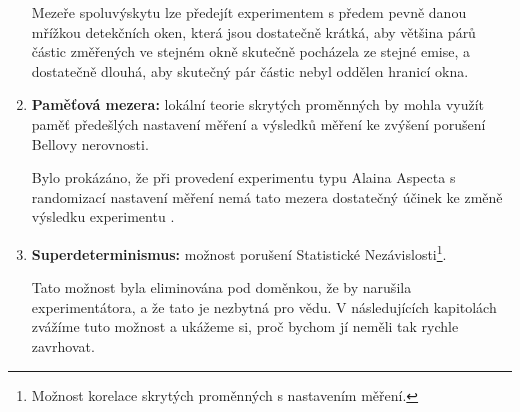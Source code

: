 \begin{enumerate}
        Mezeře spoluvýskytu lze předejít experimentem s předem pevně danou mřížkou detekčních oken, která jsou dostatečně krátká, aby většina párů částic změřených ve stejném okně skutečně pocházela ze stejné emise, a dostatečně dlouhá, aby skutečný pár částic nebyl oddělen hranicí okna.

        \item \textbf{Paměťová mezera:} lokální teorie skrytých proměnných by mohla využít paměť předešlých nastavení měření a výsledků měření ke zvýšení porušení Bellovy nerovnosti.
        
        Bylo prokázáno, že při provedení experimentu typu Alaina Aspecta \parencite*{belltest:2} s randomizací nastavení měření nemá tato mezera dostatečný účinek ke změně výsledku experimentu \parencite{measloop:1}\parencite{measloop:2}\parencite{measloop:3}.

        \item \textbf{Superdeterminismus:} možnost porušení Statistické Nezávislosti\footnote[4]{Možnost korelace skrytých proměnných s nastavením měření.}.
        
        Tato možnost byla eliminována pod doměnkou, že by narušila  experimentátora, a že tato  je nezbytná pro vědu. V následujících kapitolách zvážíme tuto možnost a ukážeme si, proč bychom jí neměli tak rychle zavrhovat.
    \end{enumerate}
    